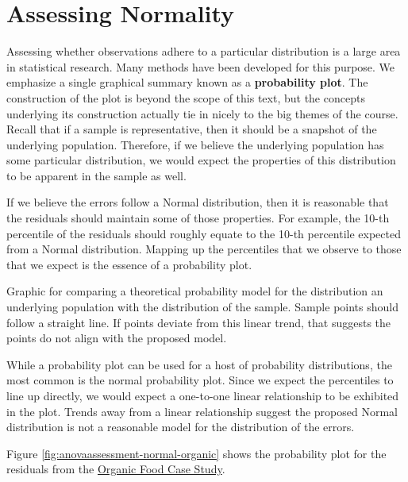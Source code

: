 \documentclass[]{book}
\theoremstyle{definition}
\theoremstyle{definition}
\theoremstyle{remark}
\let\BeginKnitrBlock\begin \let\EndKnitrBlock\end
\begin{document}
\section{Assessing Normality}\label{assessing-normality}

Assessing whether observations adhere to a particular distribution is a
large area in statistical research. Many methods have been developed for
this purpose. We emphasize a single graphical summary known as a
\textbf{probability plot}. The construction of the plot is beyond the
scope of this text, but the concepts underlying its construction
actually tie in nicely to the big themes of the course. Recall that if a
sample is representative, then it should be a snapshot of the underlying
population. Therefore, if we believe the underlying population has some
particular distribution, we would expect the properties of this
distribution to be apparent in the sample as well.

If we believe the errors follow a Normal distribution, then it is
reasonable that the residuals should maintain some of those properties.
For example, the 10-th percentile of the residuals should roughly equate
to the 10-th percentile expected from a Normal distribution. Mapping up
the percentiles that we observe to those that we expect is the essence
of a probability plot.

\BeginKnitrBlock{definition}[Probability Plot]
\protect\hypertarget{def:defn-probability-plot}{}{\label{def:defn-probability-plot}
{} }Graphic for comparing a theoretical
probability model for the distribution an underlying population with the
distribution of the sample. Sample points should follow a straight line.
If points deviate from this linear trend, that suggests the points do
not align with the proposed model.
\EndKnitrBlock{definition}

While a probability plot can be used for a host of probability
distributions, the most common is the normal probability plot. Since we
expect the percentiles to line up directly, we would expect a one-to-one
linear relationship to be exhibited in the plot. Trends away from a
linear relationship suggest the proposed Normal distribution is not a
reasonable model for the distribution of the errors.

Figure \ref{fig:anovaassessment-normal-organic} shows the probability
plot for the residuals from the \protect\hyperlink{CaseOrganic}{Organic
Food Case Study}.
\end{document}
